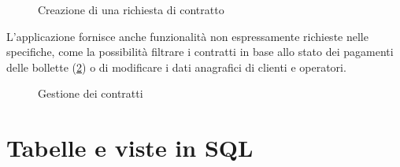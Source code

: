 \documentclass[a4paper,12pt]{report}
\begin{document}
\begin{figure}[H]
    \centering{}
    \caption{Creazione di una richiesta di contratto}
    \label{fig:sub-wizard}
\end{figure}

L'applicazione fornisce anche funzionalità non espressamente richieste nelle specifiche, come la possibilità filtrare i contratti in base allo stato dei pagamenti delle bollette (\cref{fig:sub-management}) o di modificare i dati anagrafici di clienti e operatori.

\begin{figure}[H]
    \centering{}
    \caption{Gestione dei contratti}
    \label{fig:sub-management}
\end{figure}

\appendix
\chapter{Tabelle e viste in SQL}
\end{document}
